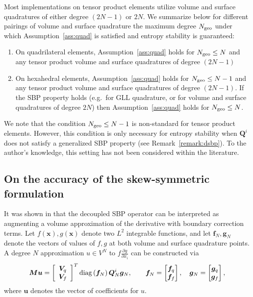 \documentclass{svjour3}                     %
\newcommand{\diag}[1]{{\rm diag}\LRp{#1}}
\newcommand{\pd}[2]{\frac{\partial#1}{\partial#2}}
\newcommand{\LRp}[1]{\left( #1 \right)}
\newcommand{\LRs}[1]{\left[ #1 \right]}
\begin{document}
Most implementations on tensor product elements utilize volume and surface quadratures of either degree $(2N-1)$ or $2N$.  We summarize below for different pairings of volume and surface quadrature the maximum degree $N_{\rm geo}$ under which Assumption~\ref{ass:quad} is satisfied and entropy stability is guaranteed:
\begin{enumerate}
\item On quadrilateral elements, Assumption~\ref{ass:quad} holds for $N_{\rm geo} \leq N$ and any tensor product volume and surface quadratures of degree $(2N-1)$ 
\item On hexahedral elements, Assumption~\ref{ass:quad} holds for $N_{\rm geo} \leq N-1$ and any tensor product volume and surface quadratures of degree $(2N-1)$.  If the SBP property holds (e.g.\ for GLL quadrature, or for volume and surface quadratures of degree $2N$) then Assumption~\ref{ass:quad} holds for $N_{\rm geo} \leq N$.
\end{enumerate}

We note that the condition $N_{\rm geo} \leq N-1$ is non-standard for tensor product elements.  However, this condition is only necessary for entropy stability when $\bm{Q}^i$ does not satisfy a generalized SBP property (see Remark~\ref{remark:dsbp}).  To the author's knowledge, this setting has not been considered within the literature.

\subsection{On the accuracy of the skew-symmetric formulation}
\label{sec:accskew}

It was shown in \cite{chan2017discretely, chan2018efficient} that the decoupled SBP operator can be interpreted as augmenting a volume approximation of the derivative with boundary correction terms.  Let $f(\bm{x}),g(\bm{x})$ denote two $L^2$ integrable functions, and let $\bm{f}_N, \bm{g}_N$ denote the vectors of values of $f,g$ at both volume and surface quadrature points.  A degree $N$ approximation $u\in V^N$ to $f\pd{g}{x_i}$ can be constructed via
\begin{equation}
\bm{M}\bm{u} = \LRs{\begin{array}{c}
\bm{V}_q \\ \bm{V}_f\end{array}}^T \diag{\bm{f}_N}\bm{Q}^i_N\bm{g}_N, \qquad \bm{f}_N = \begin{bmatrix} \bm{f}_q\\ \bm{f}_f\end{bmatrix}, \quad \bm{g}_N = \begin{bmatrix} \bm{g}_q\\ \bm{g}_f\end{bmatrix}, 
\label{eq:dsbpmatrixform}
\end{equation}
where $\bm{u}$ denotes the vector of coefficients for $u$.  
\end{document}
